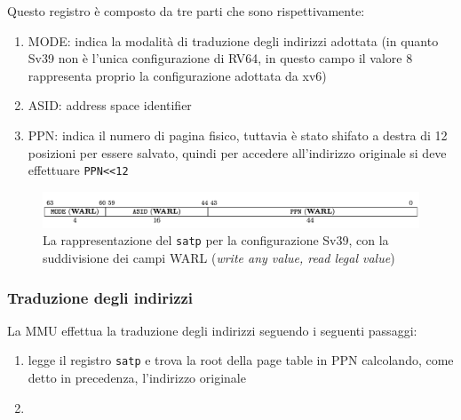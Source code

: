 Questo registro è composto da tre parti che sono rispettivamente:
\begin{enumerate}
    \item MODE: indica la modalità di traduzione degli indirizzi adottata (in quanto Sv39 non è l'unica configurazione di RV64, in questo campo il valore 8 rappresenta proprio la configurazione adottata da xv6)
    \item ASID: address space identifier 
    \item PPN: indica il numero di pagina fisico, tuttavia è stato shifato a destra di 12 posizioni per essere salvato, quindi per accedere all'indirizzo originale si deve effettuare \lstinline{PPN<<12}
\end{enumerate}
\begin{figure}[hbt!]
    \centering
    \includegraphics[width=\textwidth]{Memoria Virtuale/images/satp.png}
    \caption{La rappresentazione del \lstinline{satp} per la configurazione Sv39, con la suddivisione dei campi WARL (\textit{write any value, read legal value})}
    \label{fig:satp_sv39}
\end{figure}

\subsubsection{Traduzione degli indirizzi}
La MMU effettua la traduzione degli indirizzi seguendo i seguenti passaggi:
\begin{enumerate}
    \item legge il registro \lstinline{satp} e trova la root della page table in PPN calcolando, come detto in precedenza, l'indirizzo originale
    \item
\end{enumerate}